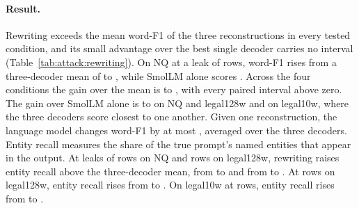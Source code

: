 \paragraph{Result.} Rewriting exceeds the mean word-F1 of the three reconstructions in every tested condition, and its small advantage over the best single decoder carries no interval (Table~\ref{tab:attack:rewriting}).
On NQ at a leak of  rows, word-F1 rises from a three-decoder mean of  to , while SmolLM alone scores . %
Across the four conditions the gain over the mean is  to , with every paired interval above zero.
The gain over SmolLM alone is  to  on NQ and legal128w and  on legal10w, where the three decoders score closest to one another. %
Given one reconstruction, the language model changes word-F1 by at most , averaged over the three decoders. %
Entity recall measures the share of the true prompt's named entities that appear in the output.
At leaks of  rows on NQ and  rows on legal128w, rewriting raises entity recall above the three-decoder mean, from  to  and from  to . %
At  rows on legal128w, entity recall rises from  to .
On legal10w at  rows, entity recall rises from  to . %

